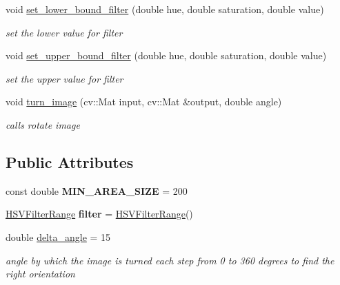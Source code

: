 \begin{DoxyCompactItemize}
void \mbox{\hyperlink{class_character___recognition___algorithm_a06c2a31ba8f4ab6e3aacea6b643a4d7d}{set\+\_\+lower\+\_\+bound\+\_\+filter}} (double hue, double saturation, double value)
\begin{DoxyCompactList}\small\item\em set the lower value for filter \end{DoxyCompactList}\item 
\mbox{\label{class_character___recognition___algorithm_a2add4eeeb34fb3a8bd35a1d5da0950a0}} 
void \mbox{\hyperlink{class_character___recognition___algorithm_a2add4eeeb34fb3a8bd35a1d5da0950a0}{set\+\_\+upper\+\_\+bound\+\_\+filter}} (double hue, double saturation, double value)
\begin{DoxyCompactList}\small\item\em set the upper value for filter \end{DoxyCompactList}\item 
\mbox{\label{class_character___recognition___algorithm_aeff8a2e07ed905b20d0150b977acd752}} 
void \mbox{\hyperlink{class_character___recognition___algorithm_aeff8a2e07ed905b20d0150b977acd752}{turn\+\_\+image}} (cv\+::\+Mat input, cv\+::\+Mat \&output, double angle)
\begin{DoxyCompactList}\small\item\em calls rotate image \end{DoxyCompactList}\end{DoxyCompactItemize}
\subsection*{Public Attributes}
\begin{DoxyCompactItemize}
\item 
\mbox{\label{class_character___recognition___algorithm_a6fda22815d819ef7d0b0cfec4baba47c}} 
const double {\bfseries M\+I\+N\+\_\+\+A\+R\+E\+A\+\_\+\+S\+I\+ZE} = 200
\item 
\mbox{\label{class_character___recognition___algorithm_a3792c162037a2049d991a1634576d915}} 
\mbox{\hyperlink{struct_h_s_v_filter_range}{H\+S\+V\+Filter\+Range}} {\bfseries filter} = \mbox{\hyperlink{struct_h_s_v_filter_range}{H\+S\+V\+Filter\+Range}}()
\item 
\mbox{\label{class_character___recognition___algorithm_a9c22f95223ecc5cfaf8e0303c30d5379}} 
double \mbox{\hyperlink{class_character___recognition___algorithm_a9c22f95223ecc5cfaf8e0303c30d5379}{delta\+\_\+angle}} = 15
\begin{DoxyCompactList}\small\item\em angle by which the image is turned each step from 0 to 360 degrees to find the right orientation \end{DoxyCompactList}\end{DoxyCompactItemize}



